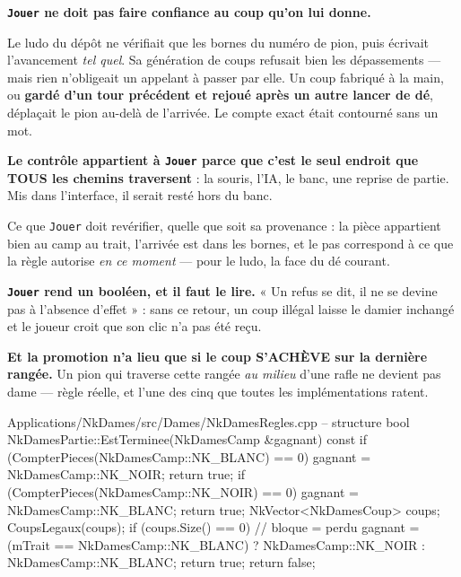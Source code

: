 \begin{nkpiege}
\textbf{\texttt{Jouer} ne doit pas faire confiance au coup qu'on lui donne.}

Le ludo du dépôt ne vérifiait que les bornes du numéro de pion, puis écrivait
l'avancement \emph{tel quel}. Sa génération de coups refusait bien les
dépassements --- mais rien n'obligeait un appelant à passer par elle. Un coup
fabriqué à la main, ou \textbf{gardé d'un tour précédent et rejoué après un
autre lancer de dé}, déplaçait le pion au-delà de l'arrivée. Le compte exact
était contourné sans un mot.

\textbf{Le contrôle appartient à \texttt{Jouer} parce que c'est le seul endroit
que TOUS les chemins traversent} : la souris, l'IA, le banc, une reprise de
partie. Mis dans l'interface, il serait resté hors du banc.

Ce que \texttt{Jouer} doit revérifier, quelle que soit sa provenance : la pièce
appartient bien au camp au trait, l'arrivée est dans les bornes, et le pas
correspond à ce que la règle autorise \emph{en ce moment} --- pour le ludo, la
face du dé courant.
\end{nkpiege}

\begin{nkretenir}
\textbf{\texttt{Jouer} rend un booléen, et il faut le lire.} « Un refus se dit,
il ne se devine pas à l'absence d'effet » : sans ce retour, un coup illégal
laisse le damier inchangé et le joueur croit que son clic n'a pas été reçu.

\textbf{Et la promotion n'a lieu que si le coup S'ACHÈVE sur la dernière
rangée.} Un pion qui traverse cette rangée \emph{au milieu} d'une rafle ne
devient pas dame --- règle réelle, et l'une des cinq que toutes les
implémentations ratent.
\end{nkretenir}

\begin{nkcode}{Applications/NkDames/src/Dames/NkDamesRegles.cpp -- structure}
bool NkDamesPartie::EstTerminee(NkDamesCamp &gagnant) const {
    if (CompterPieces(NkDamesCamp::NK_BLANC) == 0) { gagnant = NkDamesCamp::NK_NOIR;  return true; }
    if (CompterPieces(NkDamesCamp::NK_NOIR)  == 0) { gagnant = NkDamesCamp::NK_BLANC; return true; }
    NkVector<NkDamesCoup> coups;
    CoupsLegaux(coups);
    if (coups.Size() == 0) {          // bloque = perdu
        gagnant = (mTrait == NkDamesCamp::NK_BLANC) ? NkDamesCamp::NK_NOIR : NkDamesCamp::NK_BLANC;
        return true;
    }
    return false;
}
\end{nkcode}

